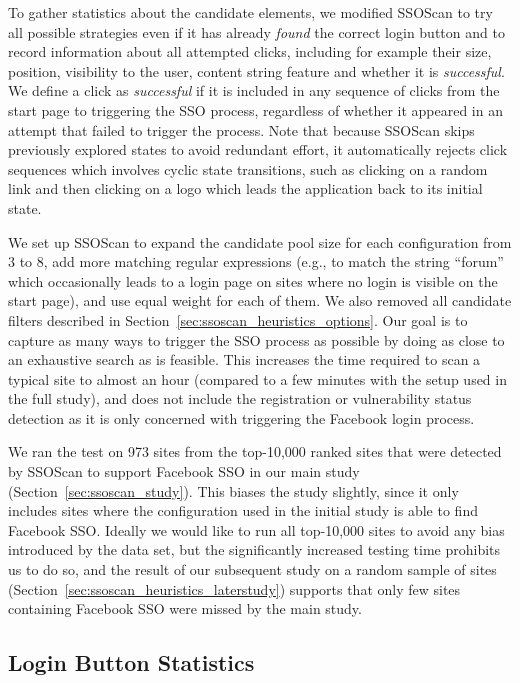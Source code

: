 To gather statistics about the candidate elements, we modified SSOScan to try all possible strategies even if it has already \emph{found} the correct login button and to record information about all attempted clicks, including for example their size, position, visibility to the user, content string feature and whether it is \emph{successful}.  We define a click as \emph{successful} if it is included in any sequence of clicks from the start page to triggering the SSO process, regardless of whether it appeared in an attempt that failed to trigger the process.  Note that because SSOScan skips previously explored states to avoid redundant effort, it automatically rejects click sequences which involves cyclic state transitions, such as clicking on a random link and then clicking on a logo which leads the application back to its initial state.

We set up SSOScan to expand the candidate pool size for each configuration from 3 to 8, add more matching regular expressions (e.g., to match the string ``forum'' which occasionally leads to a login page on sites where no login is visible on the start page), and use equal weight for each of them.  We also removed all candidate filters described in Section~\ref{sec:ssoscan_heuristics_options}.  Our goal is to capture as many ways to trigger the SSO process as possible by doing as close to an exhaustive search as is feasible.  This increases the time required to scan a typical site to almost an hour (compared to a few minutes with the setup used in the full study), and does not include the registration or vulnerability status detection as it is only concerned with triggering the Facebook login process.

We ran the test on 973 sites from the top-10,000 ranked sites that were detected by SSOScan to support Facebook SSO in our main study (Section~\ref{sec:ssoscan_study}).  This biases the study slightly, since it only includes sites where the configuration used in the initial study is able to find Facebook SSO.  Ideally we would like to run all top-10,000 sites to avoid any bias introduced by the data set, but the significantly increased testing time prohibits us to do so, and the result of our subsequent study on a random sample of sites (Section~\ref{sec:ssoscan_heuristics_laterstudy}) supports that only few sites containing Facebook SSO were missed by the main study.

\subsection{Login Button Statistics}
\label{sec:ssoscan_heuristics_loginButtonStat}

